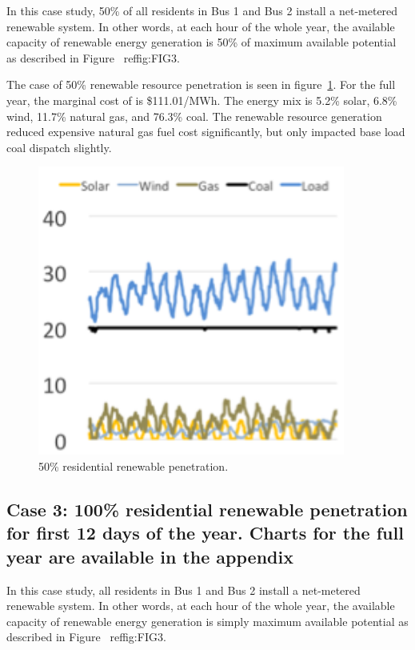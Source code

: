 \documentclass[a4paper]{article}
\begin{document}
In this case study, 50\% of all residents in Bus 1 and Bus 2 install a net-metered renewable system. In other words, at each hour of the whole year, the available capacity of renewable energy generation is 50\% of maximum available potential as described in Figure ~ref{fig:FIG3}. 

The case of 50\% renewable resource penetration is seen in figure~\ref{fig:FIG5}. For the full year, the marginal cost of is \$111.01/MWh. The energy mix is 5.2\% solar, 6.8\% wind, 11.7\% natural gas, and 76.3\% coal. The renewable resource generation reduced expensive natural gas fuel cost significantly, but only impacted base load coal dispatch slightly.

\begin{figure}[h!]
\centering
\includegraphics[width=0.9\textwidth , height=0.25\textheight]{FIG5.png}
\caption{\label{fig:FIG5}50\% residential renewable penetration.}
\end{figure}

\subsection{Case 3: 100\% residential renewable penetration for first 12 days of the year. Charts for the full year are available in the appendix}

In this case study, all residents in Bus 1 and Bus 2 install a net-metered renewable system. In other words, at each hour of the whole year, the available capacity of renewable energy generation is simply maximum available potential as described in Figure ~ref{fig:FIG3}.
\end{document}
